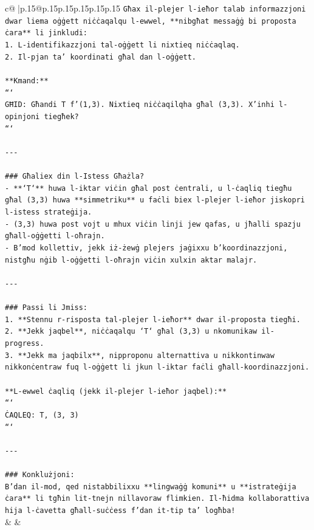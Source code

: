 \documentclass{article}
\begin{document}
{\begin{supertabular}{c@{$\;$}|p{.15\linewidth}@{}p{.15\linewidth}p{.15\linewidth}p{.15\linewidth}p{.15\linewidth}p{.15\linewidth}}
{{{\texttt{Għax il{-}plejer l{-}ieħor talab informazzjoni dwar liema oġġett niċċaqalqu l{-}ewwel, **nibgħat messaġġ bi proposta ċara** li jinkludi:} \\
\texttt{1. L{-}identifikazzjoni tal{-}oġġett li nixtieq niċċaqlaq.} \\
\texttt{2. Il{-}pjan ta' koordinati għal dan l{-}oġġett.} \\
\\ 
\texttt{**Kmand:**} \\
\texttt{```} \\
\texttt{GĦID: Għandi T f'(1,3). Nixtieq niċċaqilqha għal (3,3). X'inhi l{-}opinjoni tiegħek?} \\
\texttt{```} \\
\\ 
\texttt{{-}{-}{-}} \\
\\ 
\texttt{\#\#\# Għaliex din l{-}Istess Għażla?} \\
\texttt{{-} **`T`** huwa l{-}iktar viċin għal post ċentrali, u l{-}ċaqliq tiegħu għal (3,3) huwa **simmetriku** u faċli biex l{-}plejer l{-}ieħor jiskopri l{-}istess strateġija.} \\
\texttt{{-} (3,3) huwa post vojt u mhux viċin linji jew qafas, u jħalli spazju għall{-}oġġetti l{-}oħrajn.} \\
\texttt{{-} B'mod kollettiv, jekk iż{-}żewġ plejers jaġixxu b'koordinazzjoni, nistgħu nġib l{-}oġġetti l{-}oħrajn viċin xulxin aktar malajr.} \\
\\ 
\texttt{{-}{-}{-}} \\
\\ 
\texttt{\#\#\# Passi li Jmiss:} \\
\texttt{1. **Stennu r{-}risposta tal{-}plejer l{-}ieħor** dwar il{-}proposta tiegħi.} \\
\texttt{2. **Jekk jaqbel**, niċċaqalqu `T` għal (3,3) u nkomunikaw il{-}progress.} \\
\texttt{3. **Jekk ma jaqbilx**, nipproponu alternattiva u nikkontinwaw nikkonċentraw fuq l{-}oġġett li jkun l{-}iktar faċli għall{-}koordinazzjoni.} \\
\\ 
\texttt{**L{-}ewwel ċaqliq (jekk il{-}plejer l{-}ieħor jaqbel):**} \\
\texttt{```} \\
\texttt{ĊAQLEQ: T, (3, 3)} \\
\texttt{```} \\
\\ 
\texttt{{-}{-}{-}} \\
\\ 
\texttt{\#\#\# Konklużjoni:} \\
\texttt{B'dan il{-}mod, qed nistabbilixxu **lingwaġġ komuni** u **istrateġija ċara** li tgħin lit{-}tnejn nillavoraw flimkien. Il{-}ħidma kollaborattiva hija l{-}ċavetta għall{-}suċċess f'dan it{-}tip ta' logħba!} \\
            }
        }
    }
    & & \\ \\


\end{supertabular}}
\end{document}
